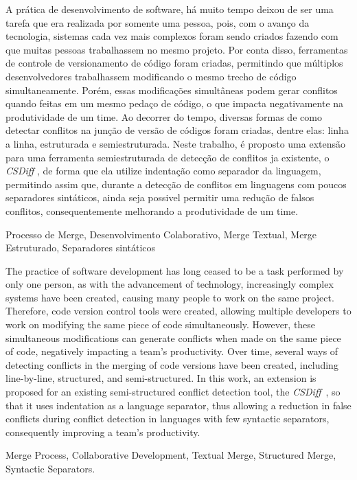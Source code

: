 \resumo
A prática de desenvolvimento de software, há muito tempo deixou de ser uma tarefa
que era realizada por somente uma pessoa, pois, com o avanço da tecnologia, sistemas
cada vez mais complexos foram sendo criados fazendo com que muitas pessoas trabalhassem no
mesmo projeto. Por conta disso, ferramentas de controle de versionamento de
código foram criadas, permitindo que múltiplos desenvolvedores trabalhassem modificando
o mesmo trecho de código simultaneamente. Porém, essas modificações simultâneas
podem gerar conflitos quando feitas em um mesmo pedaço de código, o que impacta
negativamente na produtividade de um time. Ao decorrer do tempo, diversas formas
de como detectar conflitos na junção de versão de códigos foram criadas, dentre
elas: linha a linha, estruturada e semiestruturada. Neste trabalho,
é proposto uma extensão para uma ferramenta semiestruturada de detecção de conflitos
ja existente, o \emph{CSDiff} \cite{clem21}, de forma que ela
utilize indentação como separador da linguagem, permitindo assim que, durante a
detecção de conflitos em linguagens com poucos separadores sintáticos, ainda seja
possivel permitir uma redução de falsos conflitos, consequentemente melhorando a
produtividade de um time.
\begin{keywords}
	Processo de Merge, Desenvolvimento Colaborativo, Merge Textual, Merge
	Estruturado, Separadores sintáticos
\end{keywords}

\abstract
The practice of software development has long ceased to be a task performed by
only one person, as with the advancement of technology, increasingly complex
systems have been created, causing many people to work on the same project.
Therefore, code version control tools were created, allowing multiple developers
to work on modifying the same piece of code simultaneously. However, these simultaneous
modifications can generate conflicts when made on the same piece of code, negatively
impacting a team's productivity. Over time, several ways of detecting conflicts
in the merging of code versions have been created, including line-by-line, structured,
and semi-structured. In this work, an extension is proposed for an existing
semi-structured conflict detection tool, the \emph{CSDiff}~\cite{clem21},
so that it uses indentation as a language separator, thus allowing a reduction in
false conflicts during conflict detection in languages with few syntactic separators,
consequently improving a team's productivity.
\begin{keywords}
	Merge Process, Collaborative Development, Textual Merge, Structured Merge, Syntactic Separators.
\end{keywords}

